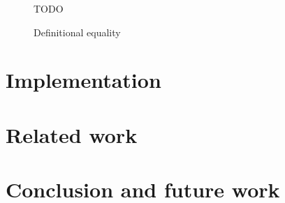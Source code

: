 \documentclass[9pt]{sigplanconf}
\begin{document}
\begin{figure*}
  \centering
  TODO
  \caption{Definitional equality}
  \label{fig:def-eq}
\end{figure*}

\section{Implementation}

\section{Related work}

\section*{Conclusion and future work}






\end{document}
